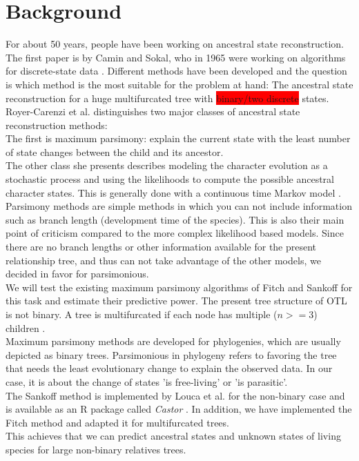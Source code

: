   \section{Background}
    For about 50 years, people have been working on ancestral state reconstruction. The first paper 
      is by Camin and Sokal, who in 1965 were working on algorithms for discrete-state data 
      \cite{Camin1965}. Different methods have been developed and the question is which method is the 
      most suitable for the problem at hand: The ancestral state reconstruction for a huge 
      multifurcated tree with \colorbox{red}{binary/two discrete} states. \\
    Royer-Carenzi et al. distinguishes two major classes of ancestral state reconstruction methods: \\
    The first is maximum parsimony: explain the current state with the least number of state changes 
      between the child and its ancestor. \\
    The other class she presents describes modeling the character evolution as a stochastic process and 
      using the likelihoods to compute the possible ancestral character states. This is generally done 
      with a continuous time Markov model \cite{RoyerCarenzi2013}. \\

    Parsimony methods are simple methods in which you can not include information such as branch 
      length (development time of the species). This is also their main point of criticism compared to 
      the more complex likelihood based models. Since there are no branch lengths or other information 
      available for the present relationship tree, and thus can not take advantage of the 
      other models, we decided in favor for parsimonious. \\

    We will test the existing maximum parsimony algorithms of Fitch \cite{Fitch1971} and Sankoff 
      \cite{Sankoff1975} for this task and estimate their predictive power. The present tree structure 
      of OTL is not binary. A tree is multifurcated if each node has multiple ($n >= 3$) children 
      \cite{Felsenstein2003}. \\
    Maximum parsimony methods are developed for phylogenies, which are usually depicted as binary trees.
      Parsimonious in phylogeny refers to favoring the tree that needs the least evolutionary change 
      to explain the observed data. In our case, it is about the change of states 'is free-living' or 
      'is parasitic'. \\
    The Sankoff method is implemented by Louca et al. for the non-binary case and is available as an R 
      package called \textit{Castor} \cite{Louca2017}. In addition, we have implemented the Fitch 
      method and adapted it for multifurcated trees. \\%
    This achieves that we can predict ancestral states and unknown states of living species for large 
      non-binary relatives trees. \\

